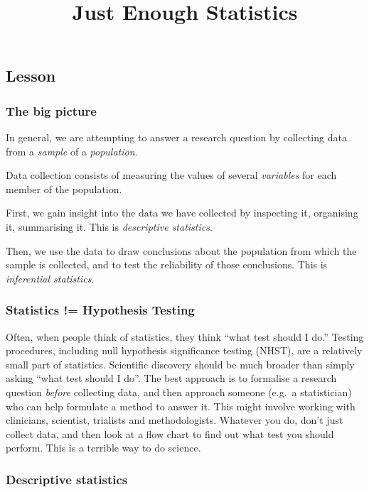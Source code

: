 \documentclass[
]{article}
\title{Just Enough Statistics}
\author{}
\date{\vspace{-2.5em}}
\begin{document}
\maketitle

\hypertarget{lesson}{%
\subsection{Lesson}\label{lesson}}

\hypertarget{the-big-picture}{%
\subsubsection{The big picture}\label{the-big-picture}}

In general, we are attempting to answer a research question by
collecting data from a \emph{sample} of a \emph{population}.

Data collection consists of measuring the values of several
\emph{variables} for each member of the population.

First, we gain insight into the data we have collected by inspecting it,
organising it, summarising it. This is \emph{descriptive statistics}.

Then, we use the data to draw conclusions about the population from
which the sample is collected, and to test the reliability of those
conclusions. This is \emph{inferential statistics}.

\hypertarget{statistics-hypothesis-testing}{%
\subsubsection{Statistics != Hypothesis
Testing}\label{statistics-hypothesis-testing}}

Often, when people think of statistics, they think ``what test should I
do.'' Testing procedures, including null hypothesis significance testing
(NHST), are a relatively small part of statistics. Scientific discovery
should be much broader than simply asking ``what test should I do''. The
best approach is to formalise a research question \emph{before}
collecting data, and then approach someone (e.g.~a statistician) who can
help formulate a method to answer it. This might involve working with
clinicians, scientist, trialists and methodologists. Whatever you do,
don't just collect data, and then look at a flow chart to find out what
test you should perform. This is a terrible way to do science.

\hypertarget{descriptive-statistics}{%
\subsubsection{Descriptive statistics}\label{descriptive-statistics}}
\end{document}
